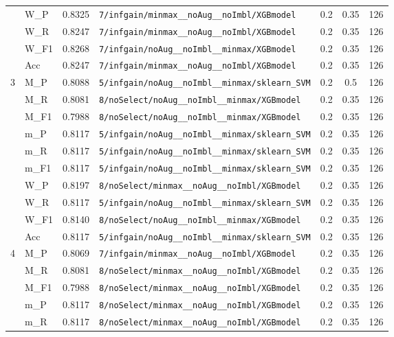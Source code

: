 \begin{table}[htbp]
\begin{tabular}{|c|l|c|>{\ttfamily\footnotesize}p{7.2cm}|c|c|c|}
 & W\_P & 0.8325 & \texttt{7/infgain/minmax\_\_noAug\_\_noImbl/XGBmodel} & 0.2 & 0.35  & 126 \\ 
 & W\_R & 0.8247 & \texttt{7/infgain/minmax\_\_noAug\_\_noImbl/XGBmodel} & 0.2 & 0.35  & 126 \\ 
 & W\_F1 & 0.8268 & \texttt{7/infgain/noAug\_\_noImbl\_\_minmax/XGBmodel} & 0.2 & 0.35  & 126 \\ 
 & Acc & 0.8247 & \texttt{7/infgain/minmax\_\_noAug\_\_noImbl/XGBmodel} & 0.2 & 0.35  & 126 \\ 
\hline
\multirow{10}{*}{3} & M\_P & 0.8088 & \texttt{5/infgain/noAug\_\_noImbl\_\_minmax/sklearn\_SVM} & 0.2 & 0.5  & 126 \\ 
 & M\_R & 0.8081 & \texttt{8/noSelect/noAug\_\_noImbl\_\_minmax/XGBmodel} & 0.2 & 0.35  & 126 \\ 
 & M\_F1 & 0.7988 & \texttt{8/noSelect/noAug\_\_noImbl\_\_minmax/XGBmodel} & 0.2 & 0.35  & 126 \\ 
 & m\_P & 0.8117 & \texttt{5/infgain/noAug\_\_noImbl\_\_minmax/sklearn\_SVM} & 0.2 & 0.35  & 126 \\ 
 & m\_R & 0.8117 & \texttt{5/infgain/noAug\_\_noImbl\_\_minmax/sklearn\_SVM} & 0.2 & 0.35  & 126 \\ 
 & m\_F1 & 0.8117 & \texttt{5/infgain/noAug\_\_noImbl\_\_minmax/sklearn\_SVM} & 0.2 & 0.35  & 126 \\ 
 & W\_P & 0.8197 & \texttt{8/noSelect/minmax\_\_noAug\_\_noImbl/XGBmodel} & 0.2 & 0.35  & 126 \\ 
 & W\_R & 0.8117 & \texttt{5/infgain/noAug\_\_noImbl\_\_minmax/sklearn\_SVM} & 0.2 & 0.35  & 126 \\ 
 & W\_F1 & 0.8140 & \texttt{8/noSelect/noAug\_\_noImbl\_\_minmax/XGBmodel} & 0.2 & 0.35  & 126 \\ 
 & Acc & 0.8117 & \texttt{5/infgain/noAug\_\_noImbl\_\_minmax/sklearn\_SVM} & 0.2 & 0.35  & 126 \\ 
\hline
\multirow{10}{*}{4} & M\_P & 0.8069 & \texttt{7/infgain/minmax\_\_noAug\_\_noImbl/XGBmodel} & 0.2 & 0.35  & 126 \\ 
 & M\_R & 0.8081 & \texttt{8/noSelect/minmax\_\_noAug\_\_noImbl/XGBmodel} & 0.2 & 0.35  & 126 \\ 
 & M\_F1 & 0.7988 & \texttt{8/noSelect/minmax\_\_noAug\_\_noImbl/XGBmodel} & 0.2 & 0.35  & 126 \\ 
 & m\_P & 0.8117 & \texttt{8/noSelect/minmax\_\_noAug\_\_noImbl/XGBmodel} & 0.2 & 0.35  & 126 \\ 
 & m\_R & 0.8117 & \texttt{8/noSelect/minmax\_\_noAug\_\_noImbl/XGBmodel} & 0.2 & 0.35  & 126 \\ 

\end{tabular}
\end{table}
